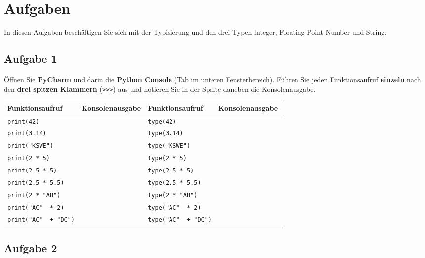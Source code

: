 \section{Aufgaben}

In diesen Aufgaben beschäftigen Sie sich mit der Typisierung und den drei Typen Integer, Floating Point Number und String.

\subsection{Aufgabe 1}

Öffnen Sie \textbf{PyCharm} und darin die \textbf{Python Console} (Tab im unteren Fensterbereich). Führen Sie jeden Funktionsaufruf \textbf{einzeln} nach den \textbf{drei spitzen Klammern} (\lstinline{>>>}) aus und notieren Sie in der Spalte daneben die Konsolenausgabe.

\begin{table}[htb]
\renewcommand{\arraystretch}{2}
\centering
\begin{tabular}{|l|p{3.5cm}|l|p{3.5cm}|}
\hline
\textbf{Funktionsaufruf} & \textbf{Konsolenausgabe} & \textbf{Funktionsaufruf} & \textbf{Konsolenausgabe} \\ \hline
\lstinline[]$print(42)$ & & \lstinline[]$type(42)$ & \\ \hline
\lstinline[]$print(3.14)$ & & \lstinline[]$type(3.14)$ &  \\ \hline
\lstinline[]$print("KSWE")$ & & \lstinline[]$type("KSWE")$ &  \\ \hline
\lstinline[]$print(2 * 5)$ & & \lstinline[]$type(2 * 5)$ &  \\ \hline
\lstinline[]$print(2.5 * 5)$ & & \lstinline[]$type(2.5 * 5)$ &  \\ \hline
\lstinline[]$print(2.5 * 5.5)$ & & \lstinline[]$type(2.5 * 5.5)$ &  \\ \hline
\lstinline[]$print(2 * "AB")$ & & \lstinline[]$type(2 * "AB")$ &  \\ \hline
\lstinline[]$print("AC"  * 2)$ & & \lstinline[]$type("AC"  * 2)$ &  \\ \hline
\lstinline[]$print("AC"  + "DC")$ & & \lstinline[]$type("AC"  + "DC")$ &  \\ \hline
\end{tabular}
\end{table}

\subsection{Aufgabe 2}

